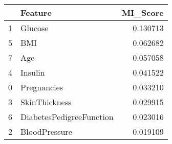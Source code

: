 \begin{tabular}{llr}
\toprule
 & Feature & MI_Score \\
\midrule
1 & Glucose & 0.130713 \\
5 & BMI & 0.062682 \\
7 & Age & 0.057058 \\
4 & Insulin & 0.041522 \\
0 & Pregnancies & 0.033210 \\
3 & SkinThickness & 0.029915 \\
6 & DiabetesPedigreeFunction & 0.023016 \\
2 & BloodPressure & 0.019109 \\
\bottomrule
\end{tabular}
